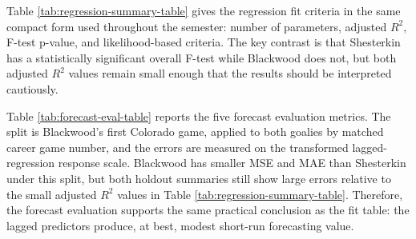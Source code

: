 \documentclass[
  10pt,
]{article}
\begin{document}
\begin{table}[H]
\centering
\caption{\label{tab:regression-summary-table}Transformed lagged-regression fit criteria.}
\centering
{}
\end{table}

Table \ref{tab:regression-summary-table} gives the regression fit criteria in the same compact form used throughout the semester: number of parameters, adjusted \(R^2\), F-test p-value, and likelihood-based criteria. The key contrast is that Shesterkin has a statistically significant overall F-test while Blackwood does not, but both adjusted \(R^2\) values remain small enough that the results should be interpreted cautiously.

\begin{table}[H]
\centering
\caption{\label{tab:forecast-eval-table}Transformed lagged-regression forecast evaluation under the aligned Colorado split.}
\centering
{}
\end{table}

Table \ref{tab:forecast-eval-table} reports the five forecast evaluation metrics. The split is Blackwood's first Colorado game, applied to both goalies by matched career game number, and the errors are measured on the transformed lagged-regression response scale. Blackwood has smaller MSE and MAE than Shesterkin under this split, but both holdout summaries still show large errors relative to the small adjusted \(R^2\) values in Table \ref{tab:regression-summary-table}. Therefore, the forecast evaluation supports the same practical conclusion as the fit table: the lagged predictors produce, at best, modest short-run forecasting value.
\end{document}
